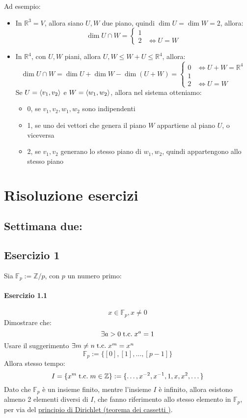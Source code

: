 \documentclass[a4paper,12pt]{article}
\begin{document}
	Ad esempio:
	\begin{itemize}
		\item In $\mathbb{R}^3 = V$, allora siano $U, W$ due piano, quindi $\dim U = \dim W = 2$, allora:
		\[\dim U \cap W = \left\{\begin{aligned}
			1 & \\
			2 & \iff U = W
		\end{aligned}\right.
		\]
		\item In $\mathbb{R}^4$, con $U, W$ piani, allora $U, W \leq W + U \leq \mathbb{R}^4$, allora:
		\[\dim U \cap W = \dim U + \dim W - \dim (U + W) = \left\{\begin{aligned}
			0 & \iff U + W = \mathbb{R}^4 \\
			1 & \\
			2 & \iff U = W
		\end{aligned}\right.\]
		Se $U = \langle v_1, v_2 \rangle$ e $W = \langle w_1, w_2 \rangle$, allora nel sistema otteniamo:
		\begin{itemize}
			\item 0, se $v_1, v_2, w_1, w_2$ sono indipendenti
			\item 1, se uno dei vettori che genera il piano $W$ appartiene al piano $U$, o viceversa
			\item 2, se $v_1, v_2$ generano lo stesso piano di $w_1, w_2$, quindi appartengono allo stesso piano
		\end{itemize} 
	\end{itemize}
	
	\newpage
	
	\section{Risoluzione esercizi}
	\subsection{Settimana due:}
	\subsection{Esercizio 1}
	Sia $\mathbb{F}_p := \mathbb{Z}/p$, con $p$ un numero primo:
	\paragraph{Esercizio 1.1}
	\[x \in \mathbb{F}_p, x \not = 0\]
	Dimostrare che:
	\[\exists a > 0 \;\text{t.c.}\; x^a = 1\]
	Usare il suggerimento $\exists m \not = n \;\text{t.c.}\; x^m = x^n$
	\[\mathbb{F}_p := \{[0], [1], \dots, [p -1]\}\]
	Allora stesso tempo:
	\[I = \{x^m \;\text{t.c.}\; m \in \mathbb{Z}\} := \{\dots, x^{-2}, x^{-1}, 1, x, x^2, \dots\}\]
	Dato che $\mathbb{F}_p$ è un insieme finito, mentre l'insieme $I$ è infinito, allora esistono almeno 2 elementi diversi di $I$, che fanno riferimento allo stesso elemento in $\mathbb{F}_p$, per via del \hyperref[sec: Dirichlet]{principio di Dirichlet (teorema dei cassetti )}.
	
\end{document}
